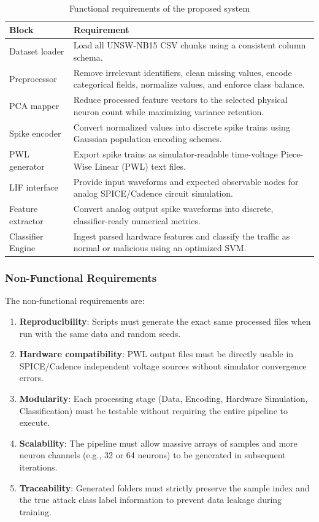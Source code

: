 \documentclass{ieeeaccess}
\begin{document}
\begin{table}[H]
\centering
\caption{Functional requirements of the proposed system}
\label{tab:functionalrequirements}
\begin{tabular}{|p{}|p{}|}
\hline
\textbf{Block} & \textbf{Requirement} \\
\hline
Dataset loader & Load all UNSW-NB15 CSV chunks using a consistent column schema. \\
\hline
Preprocessor & Remove irrelevant identifiers, clean missing values, encode categorical fields, normalize values, and enforce class balance. \\
\hline
PCA mapper & Reduce processed feature vectors to the selected physical neuron count while maximizing variance retention. \\
\hline
Spike encoder & Convert normalized values into discrete spike trains using Gaussian population encoding schemes. \\
\hline
PWL generator & Export spike trains as simulator-readable time-voltage Piece-Wise Linear (PWL) text files. \\
\hline
LIF interface & Provide input waveforms and expected observable nodes for analog SPICE/Cadence circuit simulation. \\
\hline
Feature extractor & Convert analog output spike waveforms into discrete, classifier-ready numerical metrics. \\
\hline
Classifier Engine & Ingest parsed hardware features and classify the traffic as normal or malicious using an optimized SVM. \\
\hline
\end{tabular}
\end{table}

\subsubsection{Non-Functional Requirements}

The non-functional requirements are:
\begin{enumerate}
\item \textbf{Reproducibility}: Scripts must generate the exact same processed files when run with the same data and random seeds.
\item \textbf{Hardware compatibility}: PWL output files must be directly usable in SPICE/Cadence independent voltage sources without simulator convergence errors.
\item \textbf{Modularity}: Each processing stage (Data, Encoding, Hardware Simulation, Classification) must be testable without requiring the entire pipeline to execute.
\item \textbf{Scalability}: The pipeline must allow massive arrays of samples and more neuron channels (e.g., 32 or 64 neurons) to be generated in subsequent iterations.
\item \textbf{Traceability}: Generated folders must strictly preserve the sample index and the true attack class label information to prevent data leakage during training.
\end{enumerate}
\end{document}
